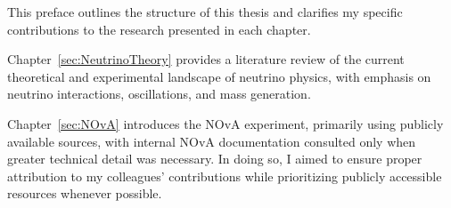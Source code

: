 \label{sec:Preface}

This preface outlines the structure of this thesis and clarifies my specific contributions to the research presented in each chapter.


Chapter~\ref{sec:NeutrinoTheory} provides a literature review of the current theoretical and experimental landscape of neutrino physics, with emphasis on neutrino interactions, oscillations, and mass generation.

Chapter~\ref{sec:NOvA} introduces the NOvA experiment, primarily using publicly available sources, with internal NOvA documentation consulted only when greater technical detail was necessary. In doing so, I aimed to ensure proper attribution to my colleagues’ contributions while prioritizing publicly accessible resources whenever possible.%

